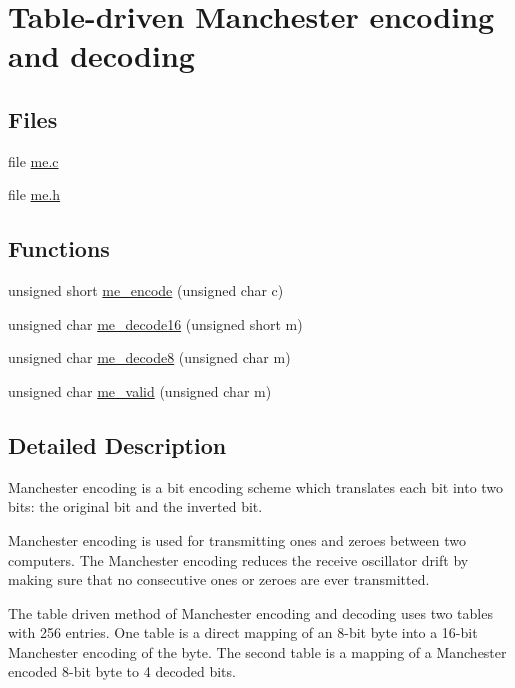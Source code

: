 \hypertarget{group__me}{}\section{Table-\/driven Manchester encoding and decoding}
\label{group__me}
\subsection*{Files}
\begin{DoxyCompactItemize}
\item 
file \hyperlink{me_8c}{me.\+c}
\item 
file \hyperlink{me_8h}{me.\+h}
\end{DoxyCompactItemize}
\subsection*{Functions}
\begin{DoxyCompactItemize}
\item 
unsigned short \hyperlink{group__me_ga72548e4a7b5ab863881a226601684a5f}{me\+\_\+encode} (unsigned char c)
\item 
unsigned char \hyperlink{group__me_ga2ba94b4f5cb665f0a50989a97dab40d9}{me\+\_\+decode16} (unsigned short m)
\item 
unsigned char \hyperlink{group__me_ga0f2e13136808a58db639c0dc56a1d64a}{me\+\_\+decode8} (unsigned char m)
\item 
unsigned char \hyperlink{group__me_ga270f4332b76bf56b924ac5dcbcecb4af}{me\+\_\+valid} (unsigned char m)
\end{DoxyCompactItemize}


\subsection{Detailed Description}
Manchester encoding is a bit encoding scheme which translates each bit into two bits\+: the original bit and the inverted bit.

Manchester encoding is used for transmitting ones and zeroes between two computers. The Manchester encoding reduces the receive oscillator drift by making sure that no consecutive ones or zeroes are ever transmitted.

The table driven method of Manchester encoding and decoding uses two tables with 256 entries. One table is a direct mapping of an 8-\/bit byte into a 16-\/bit Manchester encoding of the byte. The second table is a mapping of a Manchester encoded 8-\/bit byte to 4 decoded bits. 

